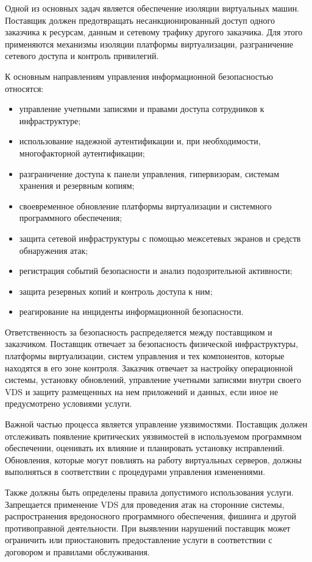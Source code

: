 \documentclass[14pt,a4paper]{extarticle}
\begin{document}
Одной из основных задач является обеспечение изоляции виртуальных машин.
Поставщик должен предотвращать несанкционированный доступ одного заказчика к
ресурсам, данным и сетевому трафику другого заказчика. Для этого применяются
механизмы изоляции платформы виртуализации, разграничение сетевого доступа и
контроль привилегий.

К основным направлениям управления информационной безопасностью относятся:
\begin{itemize}
    \item управление учетными записями и правами доступа сотрудников к
    инфраструктуре;
    \item использование надежной аутентификации и, при необходимости,
    многофакторной аутентификации;
    \item разграничение доступа к панели управления, гипервизорам, системам
    хранения и резервным копиям;
    \item своевременное обновление платформы виртуализации и системного
    программного обеспечения;
    \item защита сетевой инфраструктуры с помощью межсетевых экранов и средств
    обнаружения атак;
    \item регистрация событий безопасности и анализ подозрительной активности;
    \item защита резервных копий и контроль доступа к ним;
    \item реагирование на инциденты информационной безопасности.
\end{itemize}

Ответственность за безопасность распределяется между поставщиком и заказчиком.
Поставщик отвечает за безопасность физической инфраструктуры, платформы
виртуализации, систем управления и тех компонентов, которые находятся в его зоне
контроля. Заказчик отвечает за настройку операционной системы, установку
обновлений, управление учетными записями внутри своего VDS и защиту размещенных
на нем приложений и данных, если иное не предусмотрено условиями услуги.

Важной частью процесса является управление уязвимостями. Поставщик должен
отслеживать появление критических уязвимостей в используемом программном
обеспечении, оценивать их влияние и планировать установку исправлений. Обновления,
которые могут повлиять на работу виртуальных серверов, должны выполняться в
соответствии с процедурами управления изменениями.

Также должны быть определены правила допустимого использования услуги. Запрещается
применение VDS для проведения атак на сторонние системы, распространения
вредоносного программного обеспечения, фишинга и другой противоправной
деятельности. При выявлении нарушений поставщик может ограничить или приостановить
предоставление услуги в соответствии с договором и правилами обслуживания.
\end{document}
